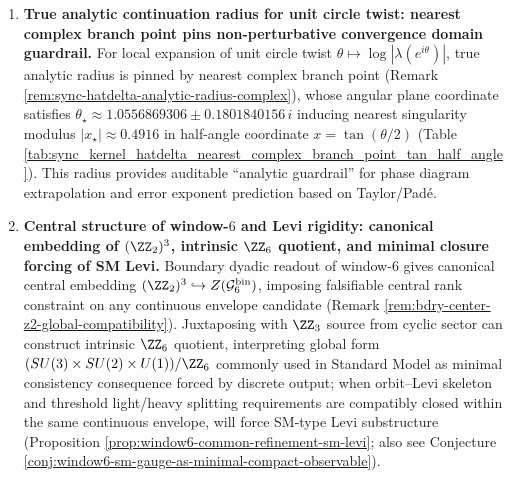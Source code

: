 \begin{enumerate}
  \item \textbf{True analytic continuation radius for unit circle twist: nearest complex branch point pins non-perturbative convergence domain guardrail.}
  For local expansion of unit circle twist \(\theta\mapsto\log|\lambda(e^{i\theta})|\), true analytic radius is pinned by nearest complex branch point (Remark \ref{rem:sync-hatdelta-analytic-radius-complex}), whose angular plane coordinate satisfies
  \(
  \theta_\star\approx 1.0556869306\pm 0.1801840156\,i
  \)
  inducing nearest singularity modulus \(|x_\star|\approx 0.4916\) in half-angle coordinate \(x=\tan(\theta/2)\) (Table \ref{tab:sync_kernel_hatdelta_nearest_complex_branch_point_tan_half_angle}).
  This radius provides auditable ``analytic guardrail'' for phase diagram extrapolation and error exponent prediction based on Taylor/Pad\'e.

  \item \textbf{Central structure of window-\texorpdfstring{$6$}{6} and Levi rigidity: canonical embedding of \texorpdfstring{$(\ZZ_2)^3$}{(Z2)^3}, intrinsic \texorpdfstring{$\ZZ_6$}{Z6} quotient, and minimal closure forcing of SM Levi.}
  Boundary dyadic readout of window-\(6\) gives canonical central embedding \((\ZZ_2)^3\hookrightarrow Z(\mathcal{G}^{\mathrm{bin}}_6)\), imposing falsifiable central rank constraint on any continuous envelope candidate (Remark \ref{rem:bdry-center-z2-global-compatibility}).
  Juxtaposing with \(\ZZ_3\) source from cyclic sector can construct intrinsic \(\ZZ_6\) quotient, interpreting global form \((SU(3)\times SU(2)\times U(1))/\ZZ_6\) commonly used in Standard Model as minimal consistency consequence forced by discrete output; when orbit--Levi skeleton and threshold light/heavy splitting requirements are compatibly closed within the same continuous envelope, will force SM-type Levi substructure (Proposition \ref{prop:window6-common-refinement-sm-levi}; also see Conjecture \ref{conj:window6-sm-gauge-as-minimal-compact-observable}).
\end{enumerate}

